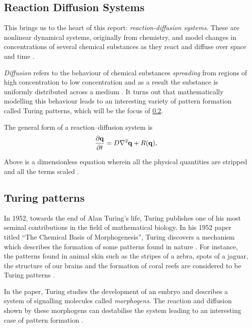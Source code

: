 \documentclass[a4paper, 11pt]{article}
\begin{document}
\subsection{Reaction Diffusion Systems}
\label{sec:rd-systems}

This brings us to the heart of this report: \emph{reaction-diffusion systems}. These are nonlinear dynamical systems, originally from chemistry, and model changes in concentrations of several chemical substances as they react and diffuse over space and time \parencite{turing1952}.

\emph{Diffusion} refers to the behaviour of chemical substances \textit{spreading} from regions of high concentration to low concentration and as a result the substance is uniformly distributed across a medium \parencite{britannicadiffusion}. It turns out that mathematically modelling this behaviour leads to an interesting variety of pattern formation called Turing patterns, which will be the focus of \cref{sec:turing-patterns}.

The general form of a reaction--diffusion system is
\begin{equation} \label{eq:rd-general}
	\frac{\partial \mathbf{q}}{\partial t} = D \nabla^2 \mathbf{q} + R(\mathbf{q}),
\end{equation}

Above is a dimensionless equation wherein all the physical quantities are stripped and all the terms scaled \parencite{strogatz}.


\subsection{Turing patterns}
\label{sec:turing-patterns}

In 1952, towards the end of Alan Turing's life, Turing publishes one of his most seminal contributions in the field of mathematical biology. In his 1952 paper titled ``The Chemical Basis of Morphogenesis'', Turing discovers a mechanism which describes the formation of some patterns found in nature \parencite{turing1952}. For instance, the patterns found in animal skin such as the stripes of a zebra, spots of a jaguar, the structure of our brains and the formation of coral reefs are considered to be Turing patterns \parencite{sheffieldturing}.

In the paper, Turing studies the development of an embryo and describes a system of signalling molecules called \emph{morphogens}. The reaction and diffusion shown by these morphogens can destabilise the system leading to an interesting case of pattern formation \parencite{turing1952}.
\end{document}
